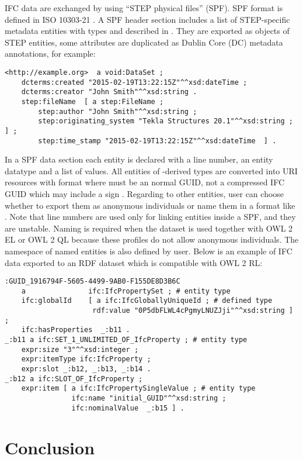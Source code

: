 IFC data are exchanged by using ``STEP physical files'' (SPF). SPF format is defined in ISO 10303-21 \cite{wiki:step-file}. A SPF header section includes a list of STEP-specific metadata entities with types   and  described in \cite{buildingSMART:ifc-header}. They are exported as objects of STEP entities, some attributes are duplicated as Dublin Core (DC) metadata annotations, for example:

\begin{lstlisting}
<http://example.org>  a void:DataSet ;
    dcterms:created "2015-02-19T13:22:15Z"^^xsd:dateTime ;
    dcterms:creator "John Smith"^^xsd:string .
    step:fileName  [ a step:FileName ;
        step:author "John Smith"^^xsd:string ;
        step:originating_system "Tekla Structures 20.1"^^xsd:string ; ] ;
        step:time_stamp "2015-02-19T13:22:15Z"^^xsd:dateTime  ] .
\end{lstlisting}


In a SPF data section each entity is declared with a line number, an entity data\-type and a list of values. All entities of -derived types are converted into URI resources with format  where  must be an normal GUID, not a compressed IFC GUID which may include a sign \name{\$}. Regarding to other entities, user can choose whether to export them as anonymous individuals or name them in a format like . Note that line numbers are used only for linking entities inside a SPF, and they are unstable. Naming is required when the dataset is used together with OWL 2 EL or OWL 2 QL because these profiles do not allow anonymous individuals. The namespace of named entities is also defined by user. Below is an example of IFC data exported to an RDF dataset which is compatible with OWL 2 RL:

\begin{lstlisting}
:GUID_1916794F-5605-4499-9AB0-F155DE8D3B6C
    a               ifc:IfcPropertySet ; # entity type
    ifc:globalId    [ a ifc:IfcGloballyUniqueId ; # defined type
                     rdf:value "0P5dbFLWL4cPgmyLNUZJji"^^xsd:string ] ;
    ifc:hasProperties  _:b11 .
_:b11 a ifc:SET_1_UNLIMITED_OF_IfcProperty ; # entity type
    expr:size "3"^^xsd:integer ;
    expr:itemType ifc:IfcProperty ;
    expr:slot _:b12, _:b13, _:b14 .
_:b12 a ifc:SLOT_OF_IfcProperty ;
    expr:item [ a ifc:IfcPropertySingleValue ; # entity type
                ifc:name "initial_GUID"^^xsd:string ;
                ifc:nominalValue  _:b15 ] .
\end{lstlisting}



\section{Conclusion}
\label{sec:conclusion}